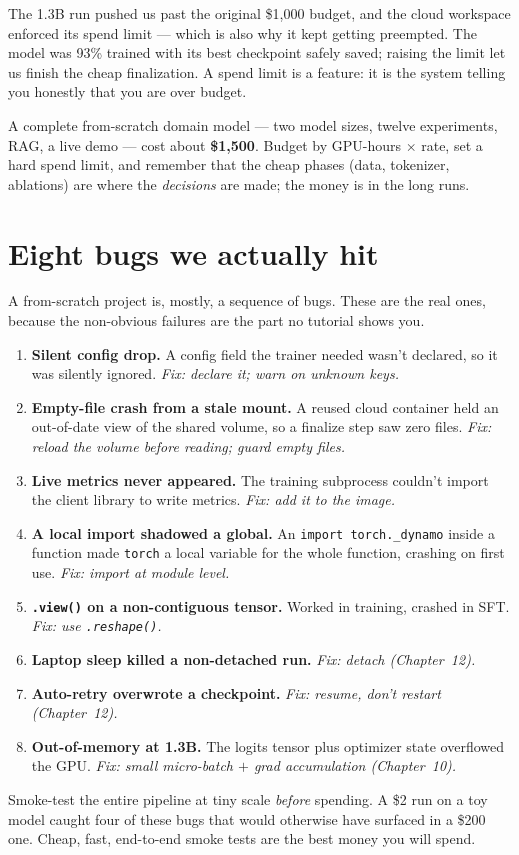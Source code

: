 \begin{gotcha}
The 1.3B run pushed us past the original \$1{,}000 budget, and the cloud workspace enforced its spend limit ---
which is also why it kept getting preempted. The model was 93\% trained with its best checkpoint safely saved;
raising the limit let us finish the cheap finalization. A spend limit is a feature: it is the system telling
you honestly that you are over budget.
\end{gotcha}

\begin{lesson}
A complete from-scratch domain model --- two model sizes, twelve experiments, RAG, a live demo --- cost about
\textbf{\$1{,}500}. Budget by GPU-hours $\times$ rate, set a hard spend limit, and remember that the cheap
phases (data, tokenizer, ablations) are where the \emph{decisions} are made; the money is in the long runs.
\end{lesson}

\chapter{Eight bugs we actually hit}

A from-scratch project is, mostly, a sequence of bugs. These are the real ones, because the non-obvious
failures are the part no tutorial shows you.

\begin{enumerate}[leftmargin=2.2em]
  \item \textbf{Silent config drop.} A config field the trainer needed wasn't declared, so it was silently
  ignored. \emph{Fix: declare it; warn on unknown keys.}
  \item \textbf{Empty-file crash from a stale mount.} A reused cloud container held an out-of-date view of the
  shared volume, so a finalize step saw zero files. \emph{Fix: reload the volume before reading; guard empty
  files.}
  \item \textbf{Live metrics never appeared.} The training subprocess couldn't import the client library to
  write metrics. \emph{Fix: add it to the image.}
  \item \textbf{A local import shadowed a global.} An \texttt{import torch.\_dynamo} inside a function made
  \texttt{torch} a local variable for the whole function, crashing on first use. \emph{Fix: import at module
  level.}
  \item \textbf{\texttt{.view()} on a non-contiguous tensor.} Worked in training, crashed in SFT.
  \emph{Fix: use \texttt{.reshape()}.}
  \item \textbf{Laptop sleep killed a non-detached run.} \emph{Fix: detach (Chapter~12).}
  \item \textbf{Auto-retry overwrote a checkpoint.} \emph{Fix: resume, don't restart (Chapter~12).}
  \item \textbf{Out-of-memory at 1.3B.} The logits tensor plus optimizer state overflowed the GPU.
  \emph{Fix: small micro-batch $+$ grad accumulation (Chapter~10).}
\end{enumerate}

\begin{lesson}
Smoke-test the entire pipeline at tiny scale \emph{before} spending. A \$2 run on a toy model caught four of
these bugs that would otherwise have surfaced in a \$200 one. Cheap, fast, end-to-end smoke tests are the best
money you will spend.
\end{lesson}

